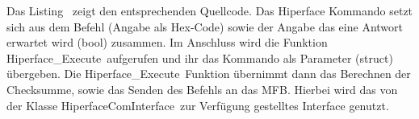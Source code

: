 \begin{center}

\begin{minipage}[h]{\textwidth}
	
\end{minipage}

\end{center}
Das Listing \dq {}\dq~zeigt den entsprechenden Quellcode. Das Hiperface Kommando setzt sich aus dem Befehl (Angabe als Hex-Code) sowie der Angabe das eine Antwort erwartet wird (bool) zusammen. Im Anschluss wird die Funktion \dq Hiperface\_Execute\dq~aufgerufen und ihr das Kommando als Parameter (struct) übergeben. Die \dq Hiperface\_Execute\dq~Funktion übernimmt dann das Berechnen der Checksumme, sowie das Senden des Befehls an das \ac{MFB}. Hierbei wird das von der Klasse \dq HiperfaceComInterface\dq~zur Verfügung gestelltes Interface genutzt.\newline

